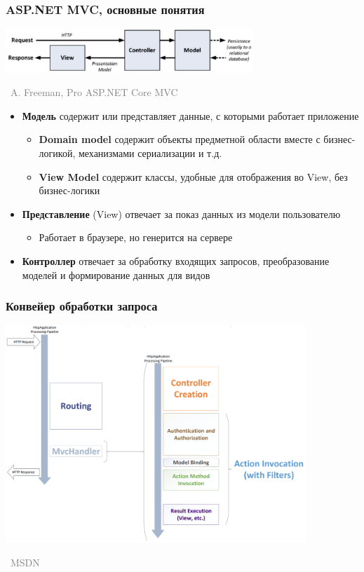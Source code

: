 \documentclass[xetex,mathserif,serif]{beamer}
\newcommand{\attribution}[1] {
\vspace{-5mm}\begin{flushright}\begin{scriptsize}\textcolor{gray}{\textcopyright\, #1}\end{scriptsize}\end{flushright}
}
\begin{document}
    \begin{frame}
        \frametitle{ASP.NET MVC, основные понятия}
        \begin{center}
            \includegraphics[width=0.7\textwidth]{mvc.png}
            \attribution{A. Freeman, Pro ASP.NET Core MVC}
        \end{center}

        \vspace{-5mm}

        \begin{itemize}
            \item \textbf{Модель} содержит или представляет данные, с которыми работает приложение
            \begin{itemize}
                \item \textbf{Domain model} содержит объекты предметной области вместе с бизнес-логикой, механизмами сериализации и т.д.
                \item \textbf{View Model} содержит классы, удобные для отображения во View, без бизнес-логики
            \end{itemize}
            \item \textbf{Представление} (View) отвечает за показ данных из модели пользователю
            \begin{itemize}
                \item Работает в браузере, но генерится на сервере
            \end{itemize}
            \item \textbf{Контроллер} отвечает за обработку входящих запросов, преобразование моделей и формирование данных для видов
        \end{itemize}
    \end{frame}

    \begin{frame}
        \frametitle{Конвейер обработки запроса}
        \begin{center}
            \includegraphics[width=0.85\textwidth]{requestLifecycle.png}
            \vspace{-5mm}
            \attribution{MSDN}
        \end{center}
    \end{frame}
\end{document}

